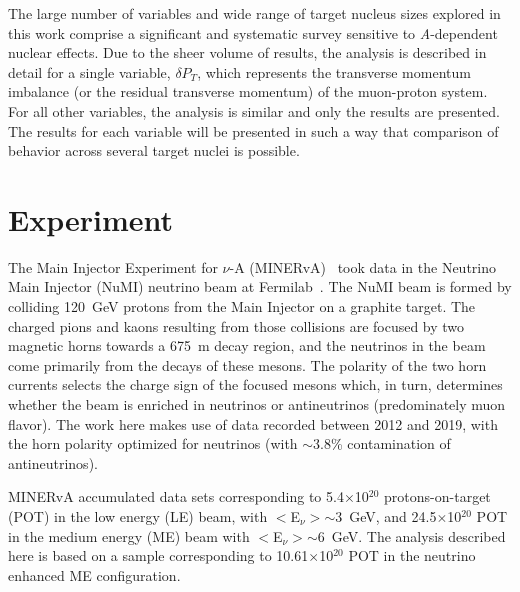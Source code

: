 \documentclass[aps,prd,twocolumn,showpacs,superscriptaddress,floatfix]{revtex4-2}  %
\newcommand{\tkidelta}{\ensuremath{\delta P_{T}}\xspace}
\begin{document}
The large number of variables and wide range of target nucleus sizes explored in this work comprise a significant and systematic survey sensitive to {\it A}-dependent nuclear effects.  Due to the sheer volume of results, the analysis is described in detail for a single variable, $\delta P_{T}$, which represents the transverse momentum imbalance (or the residual transverse momentum) of the muon-proton system.  For all other variables, the analysis is similar and only the results are presented.  
The results for each variable will be presented in such a way that comparison of behavior across several target nuclei is possible.




\section{Experiment}

The  Main Injector Experiment for $\nu$-A (MINERvA)~\cite{minervaweb, MINERvA:2013zvz} 
took data in the Neutrino Main Injector (NuMI) neutrino beam at Fermilab~\cite{numibeam}. The NuMI beam is formed by colliding 120~GeV protons from the Main Injector on a graphite target.  The charged pions and kaons resulting from those collisions are focused by two magnetic horns towards a 675~m decay region, and the neutrinos in the beam come primarily from the decays of these mesons.  The polarity of the two horn currents selects the charge sign of the focused mesons which, in turn, determines whether the beam is enriched in  neutrinos or antineutrinos (predominately muon flavor). The work here makes use of data recorded between 2012 and 2019, with the horn polarity optimized for neutrinos (with $\sim$3.8\%  contamination of antineutrinos).

MINERvA accumulated data sets corresponding to 5.4$\times$10$^{20}$ protons-on-target (POT) in the low energy (LE) beam, with $<$E$_\nu$$>$$\sim$3~GeV, and 24.5$\times$10$^{20}$ POT in the medium energy (ME) beam with $<$E$_\nu$$>$$\sim$6~GeV.  
The analysis described here is based on a sample corresponding to 10.61$\times$10$^{20}$ POT in the neutrino enhanced ME configuration.
\end{document}
